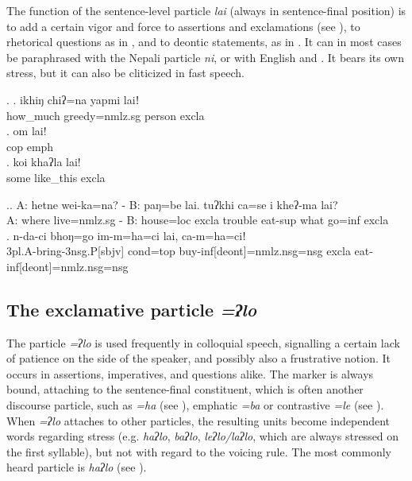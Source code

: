 The  function of the sentence-level particle \emph{lai} (always in sentence-final position) is to add a certain vigor and force to assertions and exclamations (see \Next), to rhetorical questions as in \NNext[a], and to deontic statements, as in \NNext[b]. It can in most cases be paraphrased with the Nepali particle \emph{ni}, or with English  and . It bears its own stress, but it can also be cliticized in fast speech. 
  
 \ex. \ag. ikhiŋ chiʔ=na yapmi laiǃ \\
 		how\_much greedy{\sc =nmlz.sg} person {\sc excla}\\
 	\bg. om lai!\\
 	{\sc cop} {\sc emph}\\
	  \bg. koi  khaʔla lai!\\
   		some like\_this {\sc excla}\\
	
 	\ex.\ag. A: hetne wei-ka=na?   - B: paŋ=be lai. tuʔkhi ca=se   i    kheʔ-ma lai?\\
 		A: where live{=nmlz.sg} - B: house{\sc =loc} {\sc excla} trouble eat{\sc -sup}  what go{\sc =inf} {\sc excla}\\
 	\bg. n-da-ci bhoŋ=go     im-m=ha=ci lai,  ca-m=ha=ciǃ\\
 			{\sc 3pl.A-}bring{\sc -3nsg.P[sbjv]} {\sc cond=top} buy{\sc -inf[deont]=nmlz.nsg=nsg} {\sc excla} eat{\sc -inf[deont]=nmlz.nsg=nsg}\\
 	 
	

\subsection{The exclamative particle \emph{=ʔlo}}
 
 The particle \emph{=ʔlo} is used frequently in colloquial speech, signalling a certain lack of patience on the side of the speaker, and possibly also a frustrative notion. It occurs in assertions, imperatives, and questions alike. The marker is always bound, attaching to the sentence-final constituent, which is often another discourse particle, such as \emph{=ha} (see  ), emphatic \emph{=ba} or contrastive \emph{=le} (see \Next). When \emph{=ʔlo} attaches to other particles, the resulting units become independent words regarding  stress (e.g. \emph{haʔlo}, \emph{baʔlo}, \emph{leʔlo/laʔlo}, which are always stressed on the first syllable), but not with regard to the voicing rule. The most commonly heard particle is \emph{haʔlo} (see \Next[b]).

